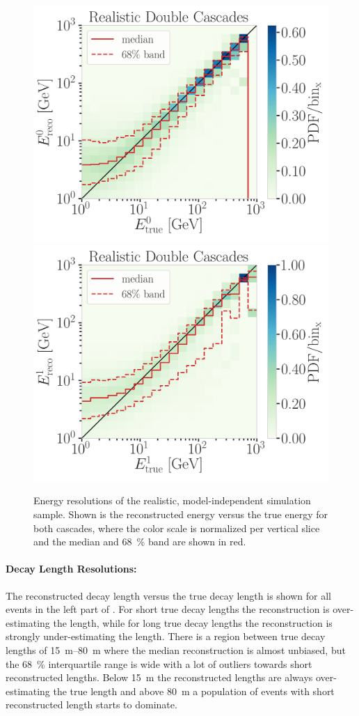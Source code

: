 \begin{figure}[h]
    \centering
    \includegraphics[width=0.49\linewidth]{figures/model_independent_simulation/results/realistic/2d_hists/194603_casc0_reco_energy_vs_casc0_true_energy_goodfit_step_contours.png}
    \includegraphics[width=0.49\linewidth]{figures/model_independent_simulation/results/realistic/2d_hists/194603_casc1_reco_energy_vs_casc1_true_energy_goodfit_step_contours.png}
    \caption[Realistic double-cascade energy resolutions]{Energy resolutions of the realistic, model-independent simulation sample. Shown is the reconstructed energy versus the true energy for both cascades, where the color scale is normalized per vertical slice and the median and \SI{68}{\percent} band are shown in red.}
\end{figure}


\paragraph{Decay Length Resolutions:}

The reconstructed decay length versus the true decay length is shown for all events in the left part of . For short true decay lengths the reconstruction is over-estimating the length, while for long true decay lengths the reconstruction is strongly under-estimating the length. There is a region between true decay lengths of \SIrange[range-phrase=~and~]{15}{80}{\meter} where the median reconstruction is almost unbiased, but the \SI{68}{\percent} interquartile range is wide with a lot of outliers towards short reconstructed lengths. Below \SI{15}{\meter} the reconstructed lengths are always over-estimating the true length and above \SI{80}{\meter} a population of events with short reconstructed length starts to dominate.

